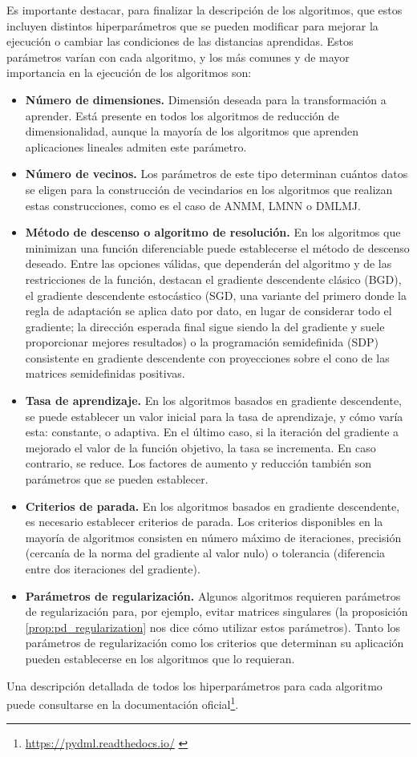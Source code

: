 Es importante destacar, para finalizar la descripción de los algoritmos, que estos incluyen distintos hiperparámetros que se pueden modificar para mejorar la ejecución o cambiar las condiciones de las distancias aprendidas. Estos parámetros varían con cada algoritmo, y los más comunes y de mayor importancia en la ejecución de los algoritmos son:
\begin{itemize}
    \item \textbf{Número de dimensiones.} Dimensión deseada para la transformación a aprender. Está presente en todos los algoritmos de reducción de dimensionalidad, aunque la mayoría de los algoritmos que aprenden aplicaciones lineales admiten este parámetro.
    \item \textbf{Número de vecinos.} Los parámetros de este tipo determinan cuántos datos se eligen para la construcción de vecindarios en los algoritmos que realizan estas construcciones, como es el caso de ANMM, LMNN o DMLMJ.
    \item \textbf{Método de descenso o algoritmo de resolución.} En los algoritmos que minimizan una función diferenciable puede establecerse el método de descenso deseado. Entre las opciones válidas, que dependerán del algoritmo y de las restricciones de la función, destacan el gradiente descendente clásico (BGD), el gradiente descendente estocástico (SGD, una variante del primero donde la regla de adaptación se aplica dato por dato, en lugar de considerar todo el gradiente; la dirección esperada final sigue siendo la del gradiente y suele proporcionar mejores resultados) o la programación semidefinida (SDP) consistente en gradiente descendente con proyecciones sobre el cono de las matrices semidefinidas positivas.
    \item \textbf{Tasa de aprendizaje.} En los algoritmos basados en gradiente descendente, se puede establecer un valor inicial para la tasa de aprendizaje, y cómo varía esta: constante, o adaptiva. En el último caso, si la iteración del gradiente a mejorado el valor de la función objetivo, la tasa se incrementa. En caso contrario, se reduce. Los factores de aumento y reducción también son parámetros que se pueden establecer.
    \item \textbf{Criterios de parada.} En los algoritmos basados en gradiente descendente, es necesario establecer criterios de parada. Los criterios disponibles en la mayoría de algoritmos consisten en número máximo de iteraciones, precisión (cercanía de la norma del gradiente al valor nulo) o tolerancia (diferencia entre dos iteraciones del gradiente).
    \item \textbf{Parámetros de regularización.} Algunos algoritmos requieren parámetros de regularización para, por ejemplo, evitar matrices singulares (la proposición \ref{prop:pd_regularization} nos dice cómo utilizar estos parámetros). Tanto los parámetros de regularización como los criterios que determinan su aplicación pueden establecerse en los algoritmos que lo requieran.
\end{itemize}
Una descripción detallada de todos los hiperparámetros para cada algoritmo puede consultarse en la documentación oficial\footnote{\url{https://pydml.readthedocs.io/} \label{pydml_doc_url}}.


